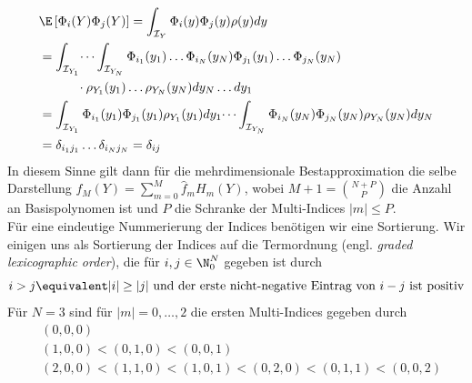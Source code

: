 \begin{equation}
\label{eqn:gpc_ortho_mv}
\begin{split}
&\E\left[\Phi_i(Y)\Phi_j(Y)\right]=\int_{\mathcal{I}_Y} \Phi_i(y)\Phi_j(y)\rho(y)dy\\
&=\int_{\mathcal{I}_{Y_1}}\dots\int_{\mathcal{I}_{Y_N}}\Phi_{i_1}(y_1)\dots\Phi_{i_N}(y_N)\Phi_{j_1}(y_1)\dots\Phi_{j_N}(y_N)\\
&\qquad\quad\cdot\rho_{Y_1}(y_1)\dots\rho_{Y_N}(y_N)dy_N\dots dy_1\\
&=\int_{\mathcal{I}_{Y_1}}\Phi_{i_1}(y_1)\Phi_{j_1}(y_1)\rho_{Y_1}(y_1)dy_1\dots\int_{\mathcal{I}_{Y_N}}\Phi_{i_N}(y_N)\Phi_{j_N}(y_N)\rho_{Y_N}(y_N)dy_N\\
&=\delta_{i_1j_1}\dots \delta_{i_Nj_N}=\delta_{ij}
\end{split}
\end{equation}
In diesem Sinne gilt dann für die mehrdimensionale Bestapproximation die selbe Darstellung $f_M(Y)=\sum_{m=0}^M\hat{f}_mH_m(Y)$, wobei $M+1=\binom{N+P}{P}$ die Anzahl an Basispolynomen ist und $P$ die Schranke der Multi-Indices $|m|\le P$.\\
Für eine eindeutige Nummerierung der Indices benötigen wir eine Sortierung. Wir einigen uns als Sortierung der Indices auf die Termordnung (engl. \emph{graded lexicographic order}), die für $i,j\in\N_0^N$ gegeben ist durch 
\[i>j \equivalent |i|\ge |j| \text{ und der erste nicht-negative Eintrag von } i-j \text { ist positiv}\]
Für $N=3$ sind für $|m|=0,\dots,2$ die ersten Multi-Indices gegeben durch
\begin{align*}
&(0,0,0)\\
&(1,0,0)<(0,1,0)<(0,0,1)\\
&(2,0,0)<(1,1,0)<(1,0,1)<(0,2,0)<(0,1,1)<(0,0,2)\\
\end{align*}
